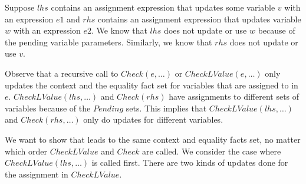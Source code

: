 Suppose $lhs$
contains an assignment expression that updates some variable $v$ with an expression $e1$ and 
$rhs$ contains an assignment expression that updates variable $w$ with an expression $e2$.  We know
that $lhs$ does not update or use $w$ because of the pending variable parameters.  Similarly, we know
that $rhs$ does not update or use $v$.

Observe that a recursive call to $Check(e, \ldots)$ or $CheckLValue(e, \ldots)$  only updates the context
and the equality fact set for variables that are assigned to in $e$.   $CheckLValue(lhs,\ldots)$ and
$Check(rhs)$ have assignments to different sets of variables because of the $Pending$ sets.  This
implies that $CheckLValue(lhs,\ldots)$ and $Check(rhs, \ldots)$ only do updates for different variables.

We want to show that leads to the same context and equality facts set, no matter which order 
$CheckLValue$ and $Check$ are called.  We consider the case where  $CheckLValue(lhs, \ldots)$ 
is called first. There are two kinds of updates done for the assignment in $CheckLValue$.
